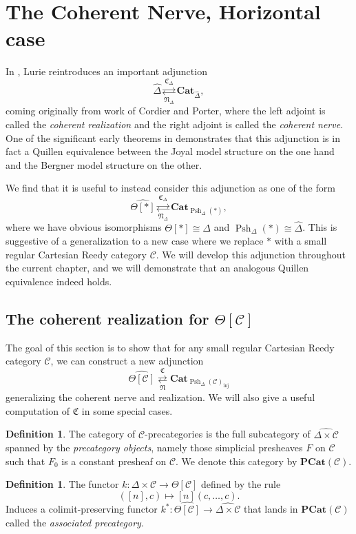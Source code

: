 \documentclass[a4paper]{article}
\numberwithin{equation}{subsection}
\theoremstyle{plain}   %
\theoremstyle{definition}
\newtheorem{defn}[equation]{Definition}
\theoremstyle{remark}
\theoremstyle{plain}
\DeclareMathOperator{\Psh}{Psh}
\newcommand{\Cat}{\ensuremath{\mathbf{Cat}}}
\newcommand{\psh}[1]{\ensuremath{\widehat{#1}}}
\providecommand{\C}{}
\renewcommand{\C}{\ensuremath{\mathcal{C}}}
\newcommand{\cellset}{\ensuremath{\widehat{\Theta[\mathcal{C}]}}}
\newcommand{\spsh}{\ensuremath{\operatorname{Psh}_\Delta(\mathcal{C})}}
\begin{document}
\section{The Coherent Nerve, Horizontal case}
In \cite{htt}, Lurie reintroduces an important adjunction \[\psh{\Delta}  \underset{\mathfrak{N}_\Delta}{\overset{\mathfrak{C}_\Delta}{\rightleftarrows}} \Cat_{\psh{\Delta}},\] coming originally from work of Cordier and Porter, where the left adjoint is called the \emph{coherent realization} and the right adjoint is called the \emph{coherent nerve}.  One of the significant early theorems in \cite{htt} demonstrates that this adjunction is in fact a Quillen equivalence between the Joyal model structure on the one hand and the Bergner model structure on the other.

We find that it is useful to instead consider this adjunction as one of the form \[\psh{\Theta[\ast]}  \underset{\mathfrak{N}_\Delta}{\overset{\mathfrak{C}_\Delta}{\rightleftarrows}} \Cat_{\Psh_\Delta(\ast)},\] where we have obvious isomorphisms \(\Theta[\ast]\cong \Delta\) and \(\Psh_\Delta(\ast)\cong \psh{\Delta}\).  This is suggestive of a generalization to a new case where we replace \(\ast\) with a small regular Cartesian Reedy category \(\C\). We will develop this adjunction throughout the current chapter, and we will demonstrate that an analogous Quillen equivalence indeed holds.
\subsection{The coherent realization for \(\Theta[\C]\)}
The goal of this section is to show that for any small regular Cartesian Reedy category \(\C\), we can construct a new adjunction
\[\cellset \underset{\mathfrak{N}}{\overset{\mathfrak{C}}{\rightleftarrows}} \Cat_{{\spsh}_{\operatorname{inj}}}\]
generalizing the coherent nerve and realization.  We will also give a useful computation of \(\mathfrak{C}\) in some special cases.

\begin{defn} 
	The category of \(\C\)-precategories is the full subcategory of \(\psh{\Delta \times \C}\) spanned by the \emph{precategory objects}, namely those simplicial presheaves \(F\) on \(\C\) such that \(F_0\) is a constant presheaf on \(\C\).  We denote this category by \(\mathbf{PCat}(\C)\). 
\end{defn}

\begin{defn}
	The functor \(k: \Delta \times \C\to \Theta[\C]\) defined by the rule 
	\[
		([n],c) \mapsto [n](c,\dots,c).
	\]
	Induces a colimit-preserving functor \(k^\ast: \cellset \to \psh{\Delta\times\C}\) that lands in \(\mathbf{PCat}(\C)\) called the \emph{associated precategory}.
\end{defn}
\end{document}
